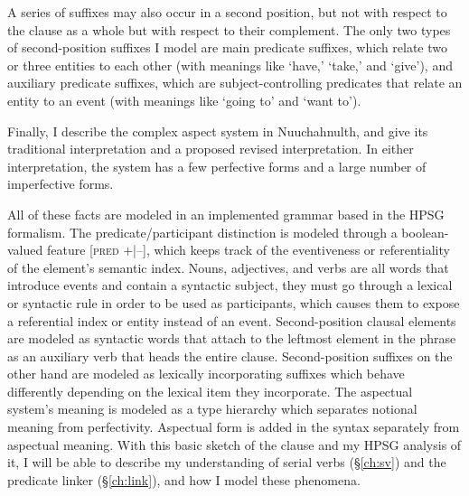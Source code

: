A series of suffixes may also occur in a second position, but not with respect to the clause as a whole but with respect to their complement. The only two types of second-position suffixes I model are main predicate suffixes, which relate two or three entities to each other (with meanings like `have,' `take,' and `give'), and auxiliary predicate suffixes, which are subject-controlling predicates that relate an entity to an event (with meanings like `going to' and `want to').

Finally, I describe the complex aspect system in Nuuchahnulth, and give its traditional interpretation and a proposed revised interpretation. In either interpretation, the system has a few perfective forms and a large number of imperfective forms.

All of these facts are modeled in an implemented grammar based in the HPSG formalism. The predicate/participant distinction is modeled through a boolean-valued feature [\textsc{pred} +|--], which keeps track of the eventiveness or referentiality of the element's semantic index. Nouns, adjectives, and verbs are all words that introduce events and contain a syntactic subject, they must go through a lexical or syntactic rule in order to be used as participants, which causes them to expose a referential index or entity instead of an event. Second-position clausal elements are modeled as syntactic words that attach to the leftmost element in the phrase as an auxiliary verb that heads the entire clause. Second-position suffixes on the other hand are modeled as lexically incorporating suffixes which behave differently depending on the lexical item they incorporate. The aspectual system's meaning is modeled as a type hierarchy which separates notional meaning from perfectivity. Aspectual form is added in the syntax separately from aspectual meaning. With this basic sketch of the clause and my HPSG analysis of it, I will be able to describe my understanding of serial verbs (\S\ref{ch:sv}) and the predicate linker (\S\ref{ch:link}), and how I model these phenomena.
